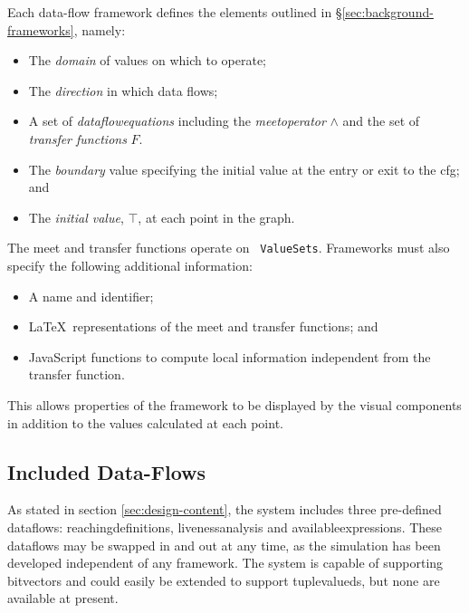 \documentclass[bsc,twoside,singlespacing,parskip,logo,notimes,normalheadings]{infthesis}
\begin{document}
    Each data-flow framework defines the elements outlined in
    \S\ref{sec:background-frameworks}, namely:

    \begin{itemize}
    \item The {\em \gls{domain}} of values on which to operate;
    \item The {\em \gls{direction}} in which data flows;
    \item A set of {\em \gls{dataflowequations}} including the {\em
        \gls{meetoperator}} $\land$ and the set of {\em
        \gls{transfer} functions} $F$.
    \item The {\em \gls{boundary}} value specifying the initial value
      at the entry or exit to the \gls{cfg}; and
    \item The {\em initial value}, $\top$, at each point in the graph.
    \end{itemize}

    The meet and transfer functions operate on {\tt
      ValueSets}. Frameworks must also specify the following additional
    information:

    \begin{itemize}
    \item A name and identifier;
    \item \LaTeX\ representations of the \gls{meet} and \gls{transfer} functions; and
    \item JavaScript functions to compute local information
      independent from the \gls{transfer} function.
    \end{itemize}

    This allows properties of the framework to be displayed by the
    visual components in addition to the values calculated at each
    point.

    \subsection{Included Data-Flows}\label{sec:impl-included-dataflows}
    As stated in section \ref{sec:design-content}, the system includes
    three pre-defined \gls{dataflow}s: \gls{reachingdefinition}s,
    \gls{livenessanalysis} and \gls{availableexpression}s. These
    \gls{dataflow}s may be swapped in and out at any time, as the
    simulation has been developed independent of any framework. The
    system is capable of supporting \gls{bitvector}s and could easily
    be extended to support \gls{tuplevalued}s, but none are available
    at present.
\end{document}
